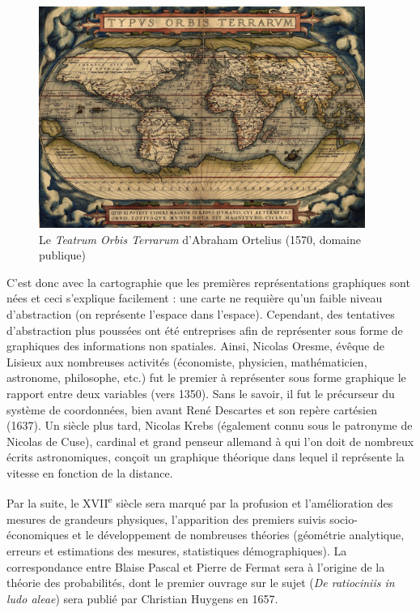 \documentclass[]{article}
\begin{document}
\begin{figure}
\centering
\includegraphics[width=0.95\textwidth,height=\textheight]{img/chap1/ortelius.png}
\caption{Le \emph{Teatrum Orbis Terrarum} d'Abraham Ortelius (1570, domaine publique)}
\end{figure}

C'est donc avec la cartographie que les premières représentations graphiques sont nées et ceci s'explique facilement : une carte ne requière qu'un faible niveau d'abstraction (on représente l'espace dans l'espace). Cependant, des tentatives d'abstraction plus poussées ont été entreprises afin de représenter sous forme de graphiques des informations non spatiales. Ainsi, Nicolas Oresme, évêque de Lisieux aux nombreuses activités (économiste, physicien, mathématicien, astronome, philosophe, etc.) fut le premier à représenter sous forme graphique le rapport entre deux variables (vers 1350). Sans le savoir, il fut le précurseur du système de coordonnées, bien avant René Descartes et son repère cartésien (1637). Un siècle plus tard, Nicolas Krebs (également connu sous le patronyme de Nicolas de Cuse), cardinal et grand penseur allemand à qui l'on doit de nombreux écrits astronomiques, conçoit un graphique théorique dans lequel il représente la vitesse en fonction de la distance.

Par la suite, le XVII\textsuperscript{e} siècle sera marqué par la profusion et l'amélioration des mesures de grandeurs physiques, l'apparition des premiers suivis socio-économiques et le développement de nombreuses théories (géométrie analytique, erreurs et estimations des mesures, statistiques démographiques). La correspondance entre Blaise Pascal et Pierre de Fermat sera à l'origine de la théorie des probabilités, dont le premier ouvrage sur le sujet (\emph{De ratiociniis in ludo aleae}) sera publié par Christian Huygens en 1657.
\end{document}
